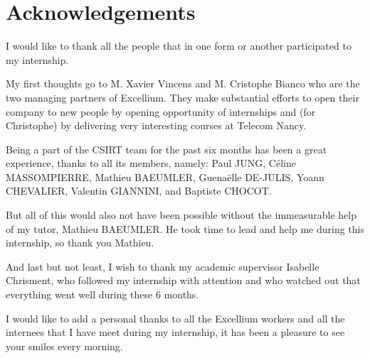 \documentclass{tnreport}
\begin{document}
\maketitle
{}


\cleardoublepage

\makesecondtitle

\section*{Acknowledgements}

I would like to thank all the people that in one form or another participated to my internship.

My first thoughts go to M. Xavier Vincens and M. Cristophe Bianco who are the two managing partners of \gls{Excellium}. They make substantial efforts to open their company to new people by opening opportunity of internships and (for Christophe) by delivering very interesting courses at Telecom Nancy.  

Being a part of the \gls{CSIRT} team for the past six months has been a great experience, thanks to all its members, namely: Paul JUNG, Céline MASSOMPIERRE, Mathieu BAEUMLER, Guenaëlle DE-JULIS, Yoann CHEVALIER, Valentin GIANNINI, and Baptiste CHOCOT.

But all of this would also not have been possible without the immeasurable help of my tutor, Mathieu BAEUMLER. He took time to lead and help me during this internship, so thank you Mathieu.

And last but not least, I wish to thank my academic supervisor Isabelle Chrisment, who followed my internship with attention and who watched out that everything went well during these 6 months.

I would like to add a personal thanks to all the \gls{Excellium} workers and all the internees that I have meet during my internship, it has been a pleasure to see your smiles every morning.

\cleardoublepage



\cleardoublepage
\end{document}
